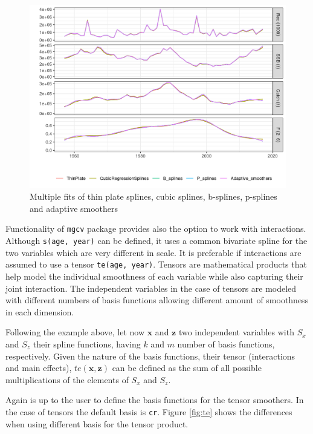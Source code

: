 \documentclass[
]{book}
\begin{document}
\begin{figure}
\centering
\includegraphics{_bookdown_files/_main_files/figure-html/a4asplines-1.png}
\caption{\label{fig:a4asplines}Multiple fits of thin plate splines, cubic splines, b-splines, p-splines and adaptive smoothers}
\end{figure}

Functionality of \texttt{mgcv} package provides also the option to work with interactions. Although \texttt{s(age,\ year)} can be defined, it uses a common bivariate spline for the two variables which are very different in scale. It is preferable if interactions are assumed to use a tensor \texttt{te(age,\ year)}. Tensors are mathematical products that help model the individual smoothness of each variable while also capturing their joint interaction. The independent variables in the case of tensors are modeled with different numbers of basis functions allowing different amount of smoothness in each dimension.

Following the example above, let now \(\mathbf{x}\) and \(\mathbf{z}\) two independent variables with \(S_x\) and \(S_z\) their spline functions, having \(k\) and \(m\) number of basis functions, respectively. Given the nature of the basis functions, their tensor (interactions and main effects), \(te(\mathbf{x},\mathbf{z})\) can be defined as the sum of all possible multiplications of the elements of \(S_x\) and \(S_z\).

Again is up to the user to define the basis functions for the tensor smoothers. In the case of tensors the default basis is \texttt{cr}. Figure \ref{fig:te} shows the differences when using different basis for the tensor product.
\end{document}
